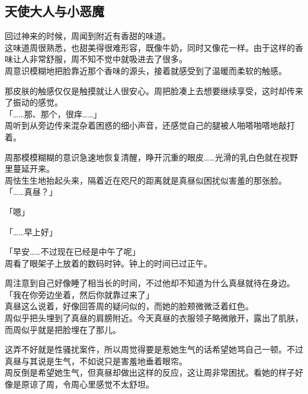 \subsection{天使大人与小恶魔}

回过神来的时候，周闻到附近有香甜的味道。\\

这味道周很熟悉，也甜美得很难形容，既像牛奶，同时又像花一样。由于这样的香味让人非常舒服，周不知不觉中就吸进去了很多。\\

周意识模糊地把脸靠近那个香味的源头，接着就感受到了温暖而柔软的触感。

那皮肤的触感仅仅是触摸就让人很安心。周把脸凑上去想要继续享受，这时却传来了振动的感觉。\\

「……那、那个，很痒……」\\

周听到从旁边传来混杂着困惑的细小声音，还感觉自己的腿被人啪嗒啪嗒地敲打着。

周那模模糊糊的意识急速地恢复清醒，睁开沉重的眼皮……光滑的乳白色就在视野里蔓延开来。\\

周怯生生地抬起头来，隔着近在咫尺的距离就是真昼似困扰似害羞的那张脸。\\

「……真昼？」

「嗯」

「……早上好」

「早安……不过现在已经是中午了呢」\\

周看了眼架子上放着的数码时钟。钟上的时间已过正午。

周注意到自己好像睡了相当长的时间，不过他却不知道为什么真昼就待在身边。\\

「我在你旁边坐着，然后你就靠过来了」\\

真昼这么说着，好像回答周的疑问似的，而她的脸颊微微泛着红色。\\

周似乎把头埋到了真昼的肩膀附近。今天真昼的衣服领子略微敞开，露出了肌肤，而周似乎就是把脸埋在了那儿。

这弄不好就是性骚扰案件，所以周觉得要是惹她生气的话希望她骂自己一顿。不过真昼与其说是生气，不如说只是害羞地垂着眼帘。\\

周反倒是希望她生气，但真昼却做出这样的反应，这让周非常困扰。看她的样子好像是原谅了周，令周心里感觉不太舒坦。\\

